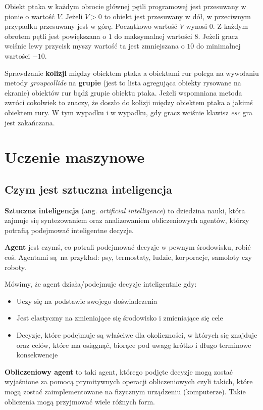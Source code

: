\documentclass[a4paper, 12pt,oneside]{book}
\begin{document}
Obiekt ptaka w każdym obrocie głównej pętli programowej jest przesuwany
w pionie o wartość $V$. Jeżeli $V > 0$ to obiekt jest przesuwany w dół,
w przeciwnym przypadku przesuwany jest w górę. Początkowo wartość $V$ wynosi
$0$. Z każdym obrotem pętli jest powiększana o $1$ do maksymalnej wartości $8$.
Jeżeli gracz wciśnie lewy przycisk myszy wartość ta jest zmniejszana o $10$ do
minimalnej wartości $-10$.

Sprawdzanie \textbf{kolizji} między obiektem ptaka a obiektami rur polega na
wywołaniu metody \textit{groupcollide} na \textbf{grupie} (jest to lista
agregująca obiekty rysowane na ekranie) obiektów rur bądź grupie obiektu ptaka. 
Jeżeli wspomniana metoda zwróci cokolwiek to znaczy, że doszło do kolizji
między obiektem ptaka a jakimś obiektem rury. W tym wypadku i w wypadku, gdy
gracz wciśnie klawisz \textit{esc} gra jest zakańczana.

\chapter{Uczenie maszynowe}
\label{chapter:uczenie}
\section{Czym jest sztuczna inteligencja}
\textbf{Sztuczna inteligencja} (ang. \textit{artificial intelligence}) to
dziedzina nauki, która zajmuje się syntezowaniem oraz analizowaniem
obliczeniowych agentów, którzy potrafią podejmować inteligentne decyzje.

\textbf{Agent} jest czymś, co potrafi podejmować decyzje w pewnym środowisku,
robić coś. Agentami są na przykład: psy, termostaty, ludzie, korporacje,
samoloty czy roboty.

Mówimy, że agent działa/podejmuje decyzje inteligentnie gdy:
\begin{itemize}
	\setlength\itemsep{-0.4em}
	\item Uczy się na podstawie swojego doświadczenia
	\item Jest elastyczny na zmieniające się środowisko i zmieniające się
		cele
	\item Decyzje, które podejmuje są właściwe dla okoliczności, w których
		się znajduje oraz celów, które ma osiągnąć, biorące pod uwagę
		krótko i długo terminowe konsekwencje
\end{itemize}

\textbf{Obliczeniowy agent} to taki agent, którego podjęte decyzje mogą
zostać wyjaśnione za pomocą prymitywnych operacji obliczeniowych
czyli takich, które mogą zostać zaimplementowane na fizycznym urządzeniu
(komputerze). Takie obliczenia mogą przyjmować wiele różnych form.
\end{document}
